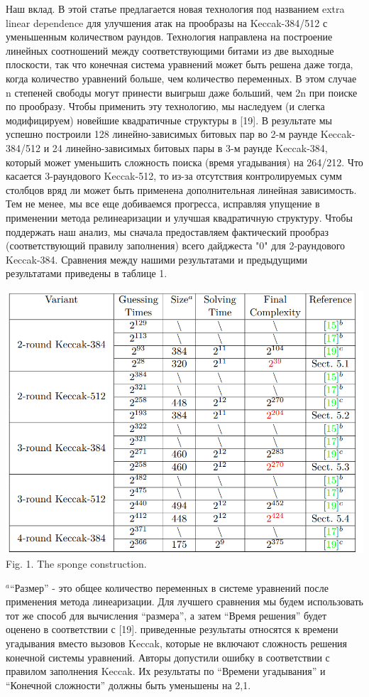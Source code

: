\documentclass[utf8,14pt,a4paper,oneside,russian]{book}
\begin{document}
Наш вклад. В этой статье предлагается новая технология под названием extra linear
dependence для улучшения атак на прообразы на Keccak-384/512 с уменьшенным количеством раундов.
Технология направлена на построение линейных соотношений между соответствующими битами из
две выходные плоскости, так что конечная система уравнений может быть решена даже тогда, когда
количество уравнений больше, чем количество переменных. В этом случае
n степеней свободы могут принести выигрыш даже больший, чем 2n при поиске по прообразу.
Чтобы применить эту технологию, мы наследуем (и слегка модифицируем) новейшие квадратичные
структуры в [19]. В результате мы успешно построили 128 линейно-зависимых битовых
пар во 2-м раунде Keccak-384/512 и 24 линейно-зависимых битовых пары в 3-м раунде
Keccak-384, который может уменьшить сложность поиска (время угадывания) на
264/212. Что касается 3-раундового Keccak-512, то из-за отсутствия контролируемых сумм столбцов
вряд ли может быть применена дополнительная линейная зависимость. Тем не менее, мы все еще добиваемся прогресса,
исправляя упущение в применении метода релинеаризации и улучшая
квадратичную структуру. Чтобы поддержать наш анализ, мы сначала предоставляем фактический
прообраз (соответствующий правилу заполнения) всего дайджеста "0" для 2-раундового Keccak-384.
Сравнения между нашими результатами и предыдущими результатами приведены в таблице 1.

\begin{center}
    \includegraphics*[scale=0.6]{1}
    Fig. 1. The sponge construction.
\end{center}

$^a$“Размер” - это общее количество переменных в системе уравнений после применения
метода линеаризации. Для лучшего сравнения мы будем использовать тот же способ
для вычисления “размера”, а затем “Время решения” будет оценено в соответствии с [19].
приведенные результаты относятся к времени угадывания вместо вызовов Keccak, которые не
включают сложность решения конечной системы уравнений.
Авторы допустили ошибку в соответствии с правилом заполнения Keccak. Их результаты
по “Времени угадывания” и “Конечной сложности” должны быть уменьшены на
2,1.
\end{document}
